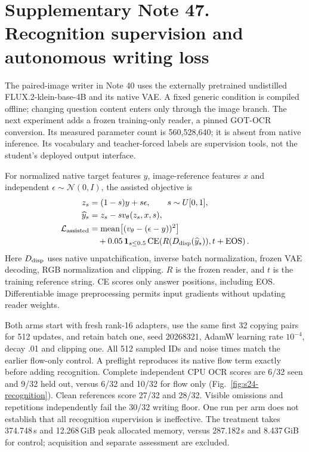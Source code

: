 \clearpage
\section*{Supplementary Note 47. Recognition supervision and autonomous writing loss}

The paired-image writer in Note 40 uses the externally pretrained undistilled
FLUX.2-klein-base-4B and its native VAE. A fixed generic condition is compiled
offline; changing question content enters only through the image branch.
The next experiment adds a frozen training-only reader, a pinned GOT-OCR
conversion\cite{gotocr}. Its measured parameter count is 560,528,640; it is
absent from native inference. Its vocabulary and teacher-forced labels are
supervision tools, not the student's deployed output interface.

For normalized native target features $y$, image-reference features $x$ and
independent $\epsilon\sim\mathcal N(0,I)$, the assisted objective is
\begin{align}
 z_s&=(1-s)y+s\epsilon,\qquad s\sim U[0,1],\\
 \widehat y_s&=z_s-sv_\theta(z_s,x,s),\\
 \mathcal L_{\mathrm{assisted}}
 &=\operatorname{mean}\bigl[(v_\theta-(\epsilon-y))^2\bigr]\nonumber\\
 &\quad+0.05\,\mathbf1_{s\leq0.5}
 \operatorname{CE}\!\left(R(D_{\rm disp}(\widehat y_s)),t+\mathrm{EOS}\right).
\end{align}
Here $D_{\rm disp}$ uses native unpatchification, inverse batch normalization,
frozen VAE decoding, RGB normalization and clipping. $R$ is the frozen reader,
and $t$ is the training reference
string. CE scores only answer positions, including EOS. Differentiable image
preprocessing permits input gradients without updating reader weights.

Both arms start with fresh rank-16 adapters, use the same first 32 copying
pairs for 512 updates, and retain batch one, seed 20268321, AdamW learning
rate $10^{-4}$, decay .01 and clipping one. All 512 sampled IDs and noise
times match the earlier flow-only control. A preflight reproduces its native
flow term exactly before adding recognition. Complete independent CPU OCR
scores are 6/32 seen and 9/32 held out, versus 6/32 and 10/32 for flow only
(Fig.~\ref{fig:s24-recognition}). Clean references score 27/32 and 28/32.
Visible omissions and repetitions independently fail the 30/32 writing floor.
One run per arm does not establish that all recognition supervision is
ineffective. The treatment takes 374.748\,s and 12.268\,GiB peak allocated
memory, versus 287.182\,s and 8.437\,GiB for control; acquisition and separate
assessment are excluded.

